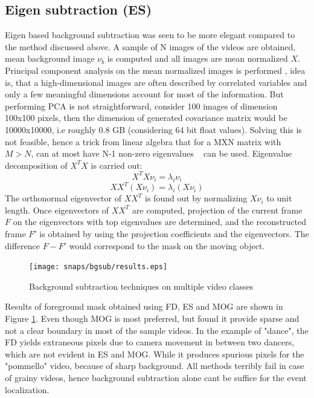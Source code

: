 \subsection{Eigen subtraction (ES)}
Eigen based background subtraction was seen to be more elegant compared to the method discussed above. A sample of N images of the videos are obtained, mean background image $\nu_b$ is computed and all images are mean normalized  $X$. Principal component analysis on the mean normalized images is performed , idea is, that a high-dimensional images are often described by correlated variables and only a few meaningful dimensions account for most of the information. But performing PCA is not straightforward, consider 100 images of dimension 100x100 pixels, then the dimension of generated covariance matrix would be 10000x10000, i.e roughly 0.8 GB (considering 64 bit float values). Solving this is not feasible, hence a trick from linear algebra that for a MXN matrix with $M>N$, can at most have N-1 non-zero eigenvalues ~\cite{Duda01} can be used. Eigenvalue decomposition of $X^TX$ is carried out:
$$X^TX\nu_i=\lambda_i\nu_i$$
$$XX^T(X\nu_i)=\lambda_i(X\nu_i)$$
The orthonormal eigenvector of $XX^T$ is found out by normalizing $X\nu_i$ to unit length. Once eigenvectors of $XX^T$  are computed, projection of the current frame $F$ on the eigenvectors with top eigenvalues are determined, and the reconstructed frame $F'$ is obtained by using the projection coefficients and the eigenvectors. The difference $F-F'$ would correspond to the mask on the moving object. 

\begin{figure}[htpb]
   \begin{center}
	    \texttt{[image: snaps/bgsub/results.eps]}     
     \caption {Background subtraction techniques on multiple video classes}
   \label{fig:bgsub}
   \end{center}
 \end{figure}
\par Results of foreground mask obtained using FD, ES and MOG are shown in Figure \ref{fig:bgsub}. Even though MOG is most preferred, but found it provide sparse and not a clear boundary in most of the sample videos. In the example of "dance", the FD yields extraneous pixels due to camera movement in between two dancers, which are not evident in ES and MOG. While it produces spurious pixels for the "pommello" video, because of sharp background. All methods terribly fail in case of grainy videos, hence background subtraction alone cant be suffice for the event localization.

